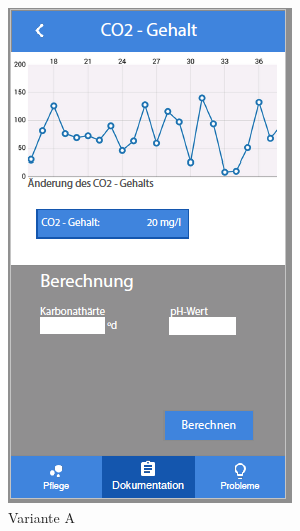 \begin{figure}
	\begin{subfigure}[b]{0.5\textwidth}
		\includegraphics[width=\textwidth]{co2gehalt}
		\caption{Variante A}
		\label{doku:co2:a}
	\end{subfigure}	
	\begin{subfigure}[b]{0.5\textwidth}

\end{subfigure}
\end{figure}

